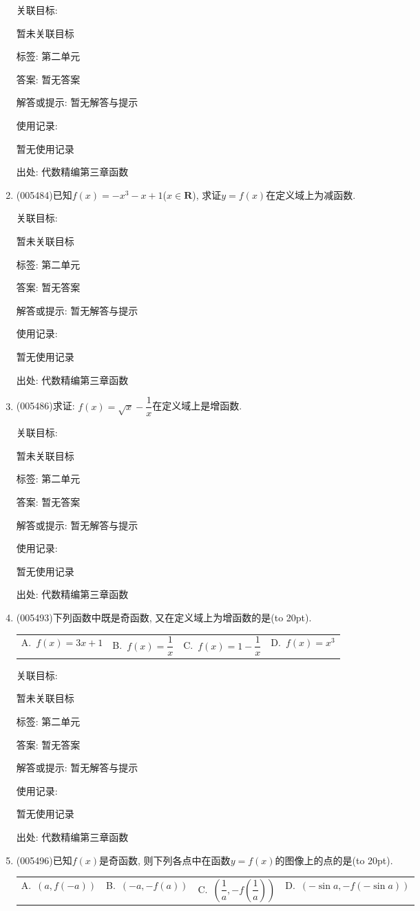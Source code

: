 \documentclass[10pt,a4paper]{article}
\newcommand{\bracket}[1]{(\hbox to #1pt{})}
\newcommand{\fourch}[4]{\par\begin{tabular}{p{.23\textwidth}p{.23\textwidth}p{.23\textwidth}p{.23\textwidth}}
A.~#1 &B.~#2& C.~#3& D.~#4
\end{tabular}}
\begin{document}
\begin{enumerate}[1.]
关联目标:

暂未关联目标



标签: 第二单元

答案: 暂无答案

解答或提示: 暂无解答与提示

使用记录:

暂无使用记录


出处: 代数精编第三章函数
\item { (005484)}已知$f(x)=-x^3-x+1$($x\in \mathbf{R}$), 求证$y=f(x)$在定义域上为减函数.


关联目标:

暂未关联目标



标签: 第二单元

答案: 暂无答案

解答或提示: 暂无解答与提示

使用记录:

暂无使用记录


出处: 代数精编第三章函数
\item { (005486)}求证: $f(x)=\sqrt x-\dfrac 1x$在定义域上是增函数.


关联目标:

暂未关联目标



标签: 第二单元

答案: 暂无答案

解答或提示: 暂无解答与提示

使用记录:

暂无使用记录


出处: 代数精编第三章函数
\item { (005493)}下列函数中既是奇函数, 又在定义域上为增函数的是\bracket{20}.
\fourch{$f(x)=3x+1$}{$f(x)=\dfrac 1x$}{$f(x)=1-\dfrac 1x$}{$f(x)=x^3$}


关联目标:

暂未关联目标



标签: 第二单元

答案: 暂无答案

解答或提示: 暂无解答与提示

使用记录:

暂无使用记录


出处: 代数精编第三章函数
\item { (005496)}已知$f(x)$是奇函数, 则下列各点中在函数$y=f(x)$的图像上的点的是\bracket{20}.
\fourch{$(a,f(-a))$}{$(-a,-f(a))$}{$(\dfrac 1a,-f(\dfrac 1a))$}{$(-\sin a,-f(-\sin a))$}



\end{enumerate}
\end{document}
